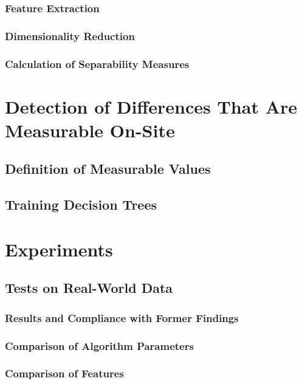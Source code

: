 \documentclass[pdftex,12pt,a4paper]{report}
\begin{document}
\subsection{Feature Extraction}

\subsection{Dimensionality Reduction}

\subsection{Calculation of Separability Measures}

\chapter{Detection of Differences That Are Measurable On-Site}
\label{chapter:measurable-differences}

\section{Definition of Measurable Values}

\section{Training Decision Trees}

\chapter{Experiments}

\section{Tests on Real-World Data}

\subsection{Results and Compliance with Former Findings}

\subsection{Comparison of Algorithm Parameters}
\label{sub:comparisonalgorithmparameters}

\subsection{Comparison of Features}
\end{document}
